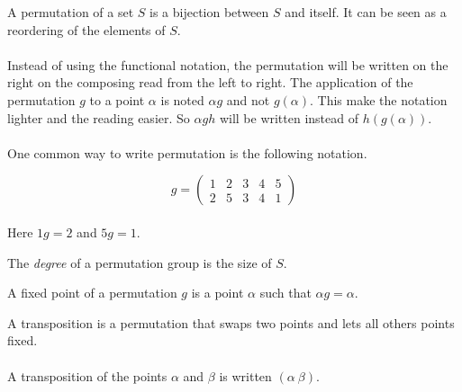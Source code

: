\begin{definition}[Permutation]
  A permutation of a set $S$ is a bijection between $S$ and itself. It can be seen as a reordering of the elements of $S$.
\end{definition}

\paragraph{}
Instead of using the functional notation, the permutation will be written on the right on the composing read from the left to right. The application of the permutation $g$ to a point $\alpha$ is noted $\alpha g$ and not $g(\alpha)$. This make the notation lighter and the reading easier. So $\alpha gh$ will be written instead of $h(g(\alpha))$.

\paragraph{}
One common way to write permutation is the following notation.

\[
  g =
  \left(
    \begin{array}{ccccc}
      1 & 2 & 3 & 4 & 5\\
      2 & 5 & 3 & 4 & 1
    \end{array}
  \right)
\]

\paragraph{}
Here $1g = 2$ and $5g = 1$.

\begin{definition}
  The \textit{degree} of a permutation group is the size of $S$.
\end{definition}

\begin{definition}
  A fixed point of a permutation $g$ is a point $\alpha$ such that $\alpha g = \alpha$.
\end{definition}

\begin{definition}[Transposition]
  A transposition is a permutation that swaps two points and lets all others points fixed.
\end{definition}

\paragraph{}
A transposition of the points $\alpha$ and $\beta$ is written $(\alpha\ \beta)$.


